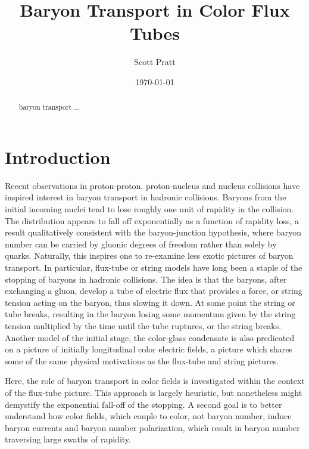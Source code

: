 \documentclass[aps, prc, 12pt, nofootinbib, showpacs, superscriptaddress, tightenlines, groupedaddress]{revtex4-2}
\begin{document}
\title{Baryon Transport in Color Flux Tubes}
\author{Scott Pratt}
\date{\today}

\pacs{}

\begin{abstract}
baryon transport ...
\end{abstract}

\maketitle

\section{Introduction}

Recent observations in proton-proton, proton-nucleus and nucleus collisions have inspired interest in baryon transport in hadronic collisions. Baryons from the initial incoming nuclei tend to lose roughly one unit of rapidity in the collision. The distribution appears to fall off exponentially as a function of rapidity loss, a result qualitatively consistent with the baryon-junction hypothesis, where baryon number can be carried by gluonic degrees of freedom rather than solely by quarks. Naturally, this inspires one to re-examine less exotic pictures of baryon transport. In particular, flux-tube or string models have long been a staple of the stopping of baryons in hadronic collisions. The idea is that the baryons, after exchanging a gluon, develop a tube of electric flux that provides a force, or string tension acting on the baryon, thus slowing it down. At some point the string or tube breaks, resulting in the baryon losing some momentum given by the string tension multiplied by the time until the tube ruptures, or the string breaks. Another model of the initial stage, the color-glass condensate is also predicated on a picture of initially longitudinal color electric fields, a picture which shares some of the same physical motivations as the flux-tube and string pictures.

Here, the role of baryon transport in color fields is investigated within the context of the flux-tube picture. This approach is largely heuristic, but nonetheless might demystify the exponential fall-off of the stopping. A second goal is to better understand how color fields, which couple to color, not baryon number, induce baryon currents and baryon number polarization, which result in baryon number traversing large swaths of rapidity. 
\end{document}

